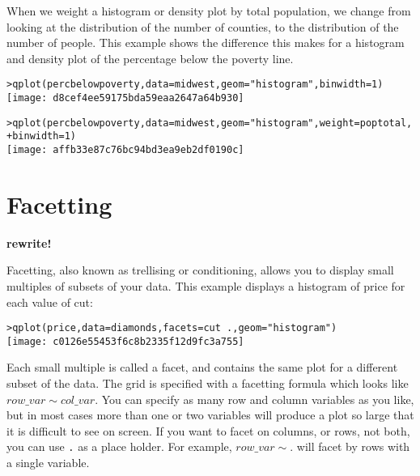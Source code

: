 When we weight a histogram or density plot by total population, we change from looking at the distribution of the number of counties, to the distribution of the number of people.  This example shows the difference this makes for a histogram and density plot of the percentage below the poverty line.

\begin{alltt}
> qplot(percbelowpoverty, data = midwest, geom = "histogram", binwidth = 1)
\texttt{[image: d8cef4ee59175bda59eaa2647a64b930]}

> qplot(percbelowpoverty, data = midwest, geom = "histogram", weight = poptotal, 
+     binwidth = 1)
\texttt{[image: affb33e87c76bc94bd3ea9eb2df0190c]}

\end{alltt}

\section{Facetting}\label{sec:facetting}

{\bf rewrite!}

Facetting, also known as trellising or conditioning, allows you to display small multiples of subsets of your data.  This example displays a histogram of price for each value of cut:

\begin{alltt}
> qplot(price, data = diamonds, facets = cut ~ ., geom = "histogram")
\texttt{[image: c0126e55453f6c8b2335f12d9fc3a755]}

\end{alltt}

Each small multiple is called a facet, and contains the same plot for a different subset of the data.  The grid is specified with a facetting formula which looks like $row\_var \sim col\_var $.  You can specify as many row and column variables as you like, but in most cases more than one or two variables will produce a plot so large that it is difficult to see on screen.  If you want to facet on columns, or rows, not both, you can use {\tt .} as a place holder.  For example, $row\_var \sim .$ will facet by rows with a single variable.  

